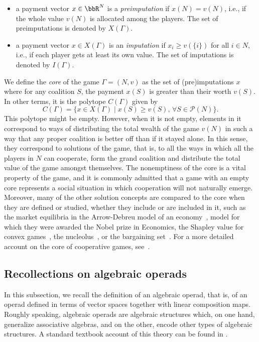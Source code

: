 \documentclass[a4paper,12pt]{amsart}
\begin{document}
\begin{itemize}
    \item a payment vector $x \in \bbR^N$ is a \emph{preimputation} if $x(N) = v(N)$, i.e., if the whole value $v(N)$ is allocated among the players. The set of preimputations is denoted by $X(\Gamma)$.
    \item a payment vector $x \in X(\Gamma)$ is an \emph{imputation} if $x_i \geq v(\{i\})$ for all \(i \in N\), i.e., if each player gets at least its own value. The set of imputations is denoted by $I(\Gamma)$.
\end{itemize} 

We define the \textit{core} of the game \(\Gamma = (N, v)\) as the set of (pre)imputations $x$ where for any coalition $S$, the payment $x(S)$ is greater than their worth $v(S)$. In other terms, it is the polytope $C(\Gamma)$ given by 
\[
C(\Gamma) = \{x \in X(\Gamma) \mid x(S) \geq v(S), \hspace{2pt} \forall S \in \mathcal{P}(N)\}. 
\]
This polytope might be empty. However, when it is not empty, elements in it correspond to ways of distributing the total wealth of the game $v(N)$ in such a way that any proper coalition is better off than if it stayed alone. In this sense, they correspond to solutions of the game, that is, to all the ways in which all the players in $N$ can cooperate, form the grand coalition and distribute the total value of the game amongst themselves. The nonemptiness of the core is a vital property of the game, and it is commonly admitted that a game with an empty core represents a social situation in which cooperation will not naturally emerge. Moreover, many of the other solution concepts are compared to the core when they are defined or studied, whether they include or are included in it, such as the market equilibria in the Arrow-Debreu model of an economy~\cite{debreu1963limit}, model for which they were awarded the Nobel prize in Economics, the Shapley value for convex games~\cite{shapley1971cores}, the nucleolus~\cite{schmeidler1969nucleolus}, or the bargaining set~\cite{AumannMaschler64}. For a more detailed account on the core of cooperative games, see~\cite{grabisch2013core, Grabisch}. 


\subsection{Recollections on algebraic operads}
In this subsection, we recall the definition of an algebraic operad, that is, of an operad defined in terms of vector spaces together with linear composition maps. Roughly speaking, algebraic operads are algebraic structures which, on one hand, generalize associative algebras, and on the other, encode other types of algebraic structures. A standard textbook account of this theory can be found in \cite{LodayVallette}.
\end{document}

